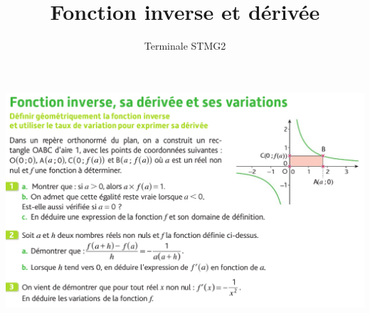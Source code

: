 \documentclass{article}
\title{Fonction inverse et dérivée}
\author{Terminale STMG2}
\date{}
\begin{document}
\begin{center}
\includegraphics[width=\textwidth]{Activite1.png}
\end{center}
\end{document}
